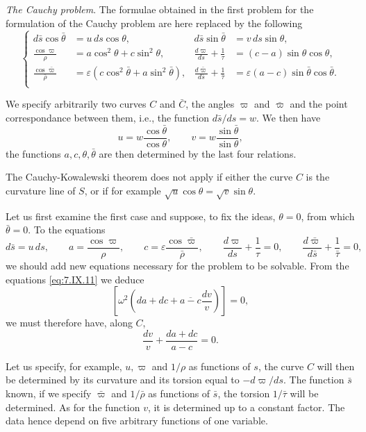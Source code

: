 \documentclass[leqno,11pt]{book}
\numberwithin{equation}{chapter}
\theoremstyle{shape1}
\theoremstyle{shape0}
\theoremstyle{shape2}
\theoremstyle{definition}
\begin{document}
\vspace{12pt}\fsec \emph{The Cauchy problem}. The formulae obtained in the first problem for the formulation of the Cauchy problem are here replaced by the following
\begin{equation}
  \label{eq:7.IX.12}\tag{IX, 12}
  \left\{
    \begin{aligned}
      d\bar s\cos\bar\theta&=u\,ds\cos\theta,&d\bar s\sin\bar\theta&=v\,ds\sin\theta,\\
      \frac{\cos\varpi}{\rho}&=a\cos^{2}\theta+c\sin^{2}\theta,&\frac{d\varpi}{ds}+\frac{1}{\tau}&=(c-a)\sin\theta\cos\theta,\\
      \frac{\cos\bar\varpi}{\bar\rho}&=\varepsilon(c\cos^{2}\bar\theta+a\sin^{2}\bar\theta),&\frac{d\bar\varpi}{d\bar s}+\frac{1}{\bar\tau}&=\varepsilon(a-c)\sin\bar\theta\cos\bar\theta.\\
    \end{aligned}
  \right.
\end{equation}

We specify arbitrarily two curves $C$ and $\bar C$, the angles $\varpi$ and $\bar\varpi$ and the point correspondance between them, i.e., the function $d\bar s/d s=w$. We then have
\[
u=w\frac{\cos\bar\theta}{\cos\theta},\qquad v=w\frac{\sin\bar\theta}{\sin\theta},
\]
the functions $a,c,\theta,\bar\theta$ are then determined by the last four relations.

The Cauchy-Kowalewski theorem does not apply if either the curve $C$ is the curvature line of $S$, or if for example $\sqrt{u}\cos\theta=\sqrt{v}\sin\theta$.

Let us first examine the first case and suppose, to fix the ideas, $\theta=0$, from which $\bar\theta=0$. To the equations
\[
d\bar s=u\,ds,\qquad a=\frac{\cos\varpi}{\rho},\qquad c=\varepsilon\frac{\cos\bar\varpi}{\bar\rho},\qquad \frac{d\varpi}{ds}+\frac{1}{\tau}=0,\qquad\frac{d\bar\varpi}{d\bar s}+\frac{1}{\bar \tau}=0,
\]
we should add new equations necessary for the problem to be solvable. From the equations \eqref{eq:7.IX.11} we deduce
\[
\left[\omega^{2}\left(da+dc+\overline{a-c}\frac{dv}{v}\right)\right]=0,
\]
we must therefore have, along $C$,
\begin{equation}
  \label{eq:7.IX.13}\tag{IX, 13}
  \frac{dv}{v}+\frac{da+dc}{a-c}=0.
\end{equation}

Let us specify, for example, $u, \varpi$ and $1/\rho$ as functions of $s$, the curve $C$ will then be determined by its curvature and its torsion equal to $-d\varpi/ds$. The function $\bar s$ known, if we specify $\bar\varpi$ and $1/\bar\rho$ as functions of $\bar s$, the torsion $1/\bar\tau$ will be determined. As for the function $v$, it is determined up to a constant factor. The data hence depend on five arbitrary functions of one variable.
\end{document}
